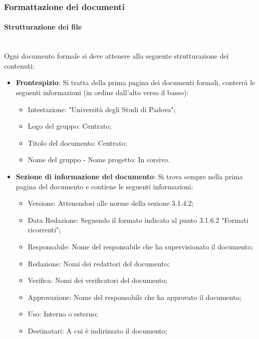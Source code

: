 \subsubsection{Formattazione dei documenti}
     \paragraph {Strutturazione dei file}
     ~\\
     Ogni documento formale si deve attenere alla seguente strutturazione dei contenuti:
        \begin{itemize}
            \item \textbf{Frontespizio}: Si tratta della prima pagina dei documenti formali, conterrà le seguenti informazioni (in ordine dall'alto verso il basso):
                \begin{itemize}
                    \item Intestazione: "Università degli Studi di Padova";
                    \item Logo del gruppo: Centrato;
                    \item Titolo del documento: Centrato;
                    \item Nome del gruppo - Nome progetto: In corsivo.
                \end{itemize}
            \item \textbf{Sezione di informazione del documento}: Si trova sempre nella prima pagina del documento e contiene le seguenti informazioni:
                \begin{itemize}
                    \item Versione: Attenendosi alle norme della sezione 3.1.4.2;
                    \item Data Redazione: Seguendo il formato indicato al punto 3.1.6.2 "Formati ricorrenti";
                    \item Responsabile: Nome del responsabile che ha supervisionato il documento;
                    \item Redazione: Nomi dei redattori del documento;
                    \item Verifica: Nomi dei verificatori del documento;
                    \item Approvazione: Nome del responsabile che ha approvato il documento;
                    \item Uso: Interno o esterno;
                    \item Destinatari: A cui è indirizzato il documento;

\end{itemize}
\end{itemize}
